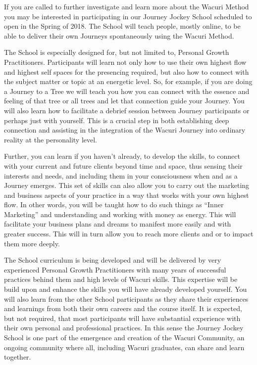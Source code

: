 \documentclass[12pt]{book}
\begin{document}
If you are called to further investigate and learn more about the
Wacuri Method you may be interested in participating in our Journey
Jockey School scheduled to open in the Spring of 2018. The School will
teach people, mostly online, to be able to deliver their own Journeys
spontaneously using the Wacuri Method.

The School is especially designed for, but not limited to, Personal
Growth Practitioners. Participants will learn not only how to use
their own highest flow and highest self spaces for the presencing
required, but also how to connect with the subject matter or topic at
an energetic level. So, for example, if you are doing a Journey to a
Tree we will teach you how you can connect with the essence and
feeling of that tree or all trees and let that connection guide your
Journey. You will also learn how to facilitate a debrief session
between Journey participants or perhaps just with yourself. This is a
crucial step in both establishing deep connection and assisting in the
integration of the Wacuri Journey into ordinary reality at the
personality level.

Further, you can learn if you haven't already, to develop the skills,
to connect with your current and future clients beyond time and space,
thus sensing their interests and needs, and including them in your
consciousness when and as a Journey emerges. This set of skills can
also allow you to carry out the marketing and business aspects of your
practice in a way that works with your own highest flow. In other
words, you will be taught how to do such things as
“Inner Marketing” and understanding and working with money as
energy. This will facilitate your business plans and dreams to
manifest more easily and with greater success. This will in turn
allow you to reach more clients and or to impact them more deeply.

The School curriculum is being developed and will be delivered by very
experienced Personal Growth Practitioners with many years of
successful practices behind them and high levels of Wacuri
skills. This expertise will be build upon and enhance the skills you
will have already developed yourself. You will also learn from the
other School participants as they share their experiences and
learnings from both their own careers and the course itself. It is
expected, but not required, that most participants will have
substantial experience with their own personal and professional
practices. In this sense the Journey Jockey School is one part of the
emergence and creation of the Wacuri Community, an ongoing community
where all, including Wacuri graduates, can share and learn together.
\end{document}
